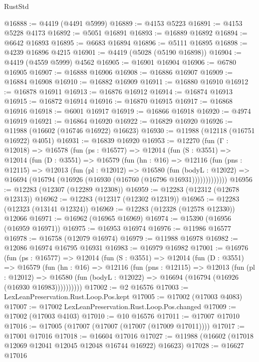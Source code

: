 \begin{lexlean}{RustStd}
\begin{coremodule}
@16888 := @4419 (@4491 @5999)
@16889 := @4153 @5223
@16891 := @4153 @5228 @4173
@16892 := @5051 @16891
@16893 := @16889 @16892
@16894 := @6642 @16893
@16895 := @6683 @16894
@16896 := @5111 @16895
@16898 := @4239 @16896 @4215
@16901 := @4419 (@5028 (@5190 @16898))
@16904 := @4419 (@4559 @5999) @4562
@16905 := @16901 @16904
@16906 := @6780 @16905
@16907 := @16888 @16906
@16908 := @16886 @16907
@16909 := @16884 @16908
@16910 := @16882 @16909
@16911 := @16880 @16910
@16912 := @16878 @16911
@16913 := @16876 @16912
@16914 := @16874 @16913
@16915 := @16872 @16914
@16916 := @16870 @16915
@16917 := @16868 @16916
@16918 := @6001 @16917
@16919 := @16866 @16918
@16920 := @4974 @16919
@16921 := @16864 @16920
@16922 := @16829 @16920
@16926 := @11988 (@16602 (@16746 @16922) @16623)
@16930 := @11988 (@12118 (@16751 @16922) @4051)
@16931 := @16839 @16920
@16953 := @12270
    (fun (Γ : @12018) =>
    @16578
      (fun (ps : @16577) =>
      @12014
        (fun (S : @3551) =>
        @12014
          (fun (D : @3551) =>
          @16579
            (fun (hn : @16) =>
            @12116
              (fun (pns : @12115) =>
              @12013
                (fun (pl : @12012) =>
                @16580
                  (fun (bodyL : @12022) =>
                  @16694 (@16794 (@16926 (@16930 (@16760 (@16796 @16931)))))))))))))
@16956 := @12283 (@12307 (@12289 @12308))
@16959 := @12283 (@12312 (@12678 @12313))
@16962 := @12283 (@12317 (@12302 @12319))
@16965 := @12283 (@12323 (@13141 @12324))
@16969 := @12283 (@12328 (@12578 @12330)) @12066
@16971 := @16962 (@16965 @16969)
@16974 := @15390 (@16956 (@16959 @16971))
@16975 := @16953 @16974
@16976 := @11986 @16577
@16978 := @16758 (@12079 @16974)
@16979 := @11988 @16978
@16982 := @12086 @16974 @16795 @16931
@16983 := @16979 @16982
@17001 := @16976
    (fun (ps : @16577) =>
    @12014
      (fun (S : @3551) =>
      @12014
        (fun (D : @3551) =>
        @16579
          (fun (hn : @16) =>
          @12116
            (fun (pns : @12115) =>
            @12013
              (fun (pl : @12012) =>
              @16580 (fun (bodyL : @12022) => @16694 (@16794 (@16926 (@16930 @16983))))))))))
@17002 := @2 @16576
@17003 := LexLeanPreservation.Rust.Loop.Pos.kept
@17005 := @17002 (@17003 @4083)
@17007 := @17002 LexLeanPreservation.Rust.Loop.Pos.changed
@17009 := @17002 (@17003 @4103)
@17010 := @10 @16576
@17011 := @17007 @17010
@17016 := @17005 (@17007 (@17007 (@17007 (@17009 @17011))))
@17017 := @17001 @17016
@17018 := @16604 @17016
@17027 := @11988 (@16602 (@17018 @12069 @12041 @12045 @12048 @16744 @16922) @16623)
@17028 := @16627 @17016

\end{coremodule}
\end{lexlean}
